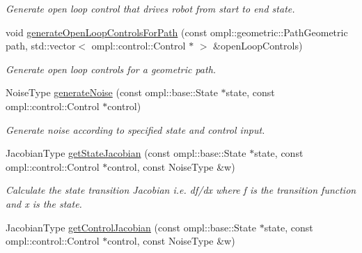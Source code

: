 \begin{DoxyCompactItemize}
\begin{DoxyCompactList}\small\item\em Generate open loop control that drives robot from start to end state. \end{DoxyCompactList}\item 
\hypertarget{class_omnidirectional_motion_model_ab84e64fe3882a94a8ccfd8784c09b312}{void \hyperlink{class_omnidirectional_motion_model_ab84e64fe3882a94a8ccfd8784c09b312}{generate\-Open\-Loop\-Controls\-For\-Path} (const ompl\-::geometric\-::\-Path\-Geometric path, std\-::vector$<$ ompl\-::control\-::\-Control $\ast$ $>$ \&open\-Loop\-Controls)}\label{class_omnidirectional_motion_model_ab84e64fe3882a94a8ccfd8784c09b312}

\begin{DoxyCompactList}\small\item\em Generate open loop controls for a geometric path. \end{DoxyCompactList}\item 
\hypertarget{class_omnidirectional_motion_model_a65b14e90ae1f013612c742eebc63360a}{Noise\-Type \hyperlink{class_omnidirectional_motion_model_a65b14e90ae1f013612c742eebc63360a}{generate\-Noise} (const ompl\-::base\-::\-State $\ast$state, const ompl\-::control\-::\-Control $\ast$control)}\label{class_omnidirectional_motion_model_a65b14e90ae1f013612c742eebc63360a}

\begin{DoxyCompactList}\small\item\em Generate noise according to specified state and control input. \end{DoxyCompactList}\item 
\hypertarget{class_omnidirectional_motion_model_a487e5bb062b9bfa9e4413c7275ffb119}{Jacobian\-Type \hyperlink{class_omnidirectional_motion_model_a487e5bb062b9bfa9e4413c7275ffb119}{get\-State\-Jacobian} (const ompl\-::base\-::\-State $\ast$state, const ompl\-::control\-::\-Control $\ast$control, const Noise\-Type \&w)}\label{class_omnidirectional_motion_model_a487e5bb062b9bfa9e4413c7275ffb119}

\begin{DoxyCompactList}\small\item\em Calculate the state transition Jacobian i.\-e. df/dx where f is the transition function and x is the state. \end{DoxyCompactList}\item 
\hypertarget{class_omnidirectional_motion_model_aa4a784c4fd2a8b360de82d37fe5ea37c}{Jacobian\-Type \hyperlink{class_omnidirectional_motion_model_aa4a784c4fd2a8b360de82d37fe5ea37c}{get\-Control\-Jacobian} (const ompl\-::base\-::\-State $\ast$state, const ompl\-::control\-::\-Control $\ast$control, const Noise\-Type \&w)}\label{class_omnidirectional_motion_model_aa4a784c4fd2a8b360de82d37fe5ea37c}


\end{DoxyCompactItemize}
